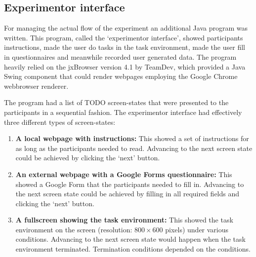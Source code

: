 \subsection{Experimentor interface}

For managing the actual flow of the experiment an additional Java program was written. This program, called the `experimentor interface', showed participants instructions, made the user do tasks in the task environment, made the user fill in questionnaires and meanwhile recorded user generated data. The program heavily relied on the jxBrowser version 4.1 by TeamDev, which provided a Java Swing component that could render webpages employing the Google Chrome webbrowser renderer. 

The program had a list of TODO screen-states that were presented to the participants in a sequential fashion. The experimentor interface had effectively three different types of screen-states:
\begin{enumerate}
	\item{\textbf{A local webpage with instructions:}} This showed a set of instructions for as long as the participants needed to read. Advancing to the next screen state could be achieved by clicking the `next' button.
	\item{\textbf{An external webpage with a Google Forms questionnaire:}} This showed a Google Form that the participants needed to fill in. Advancing to the next screen state could be achieved by filling in all required fields and clicking the `next' button.
	\item{\textbf{A fullscreen showing the task environment:}} This showed the task environment on the screen (resolution: $800 \times 600$ pixels) under various conditions. Advancing to the next screen state would happen when the task environment terminated. Termination conditions depended on the conditions.
\end{enumerate}



